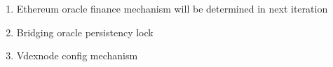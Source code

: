 \documentclass[]{article}
\begin{document}
\begin{enumerate}
\begin{enumerate}
		\item Ethereum oracle finance mechanism will be determined in next iteration
		\item Bridging oracle persistency lock 
		\item Vdexnode config mechanism
			
\end{enumerate}
			
\end{enumerate}
\end{document}
